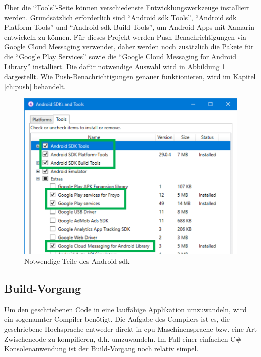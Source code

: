 Über die \enquote{Tools}-Seite können verschiedenste Entwicklungswerkzeuge installiert werden.
Grundsätzlich erforderlich sind \enquote{Android \ac{sdk} Tools}, \enquote{Android \ac{sdk} Platform Tools} und \enquote{Android \ac{sdk} Build Tools}, um Android-Apps mit Xamarin entwickeln zu können.
Für dieses Projekt werden Push-Benachrichtigungen via Google Cloud Messaging verwendet, daher werden noch zusätzlich die Pakete für die \enquote{Google Play Services} sowie die \enquote{Google Cloud Messaging for Android Library} installiert.
Die dafür notwendige Auswahl wird in Abbildung \ref{fig:android-sdk-tools} dargestellt.
Wie Push-Benachrichtigungen genauer funktionieren, wird im Kapitel \ref{ch:push} behandelt.
\begin{figure}[htbp!]
    \centering\includegraphics[width=0.8\linewidth]{images/auswahl_rahmenwerk/android_sdk_auswahl.png}    
    \caption{Notwendige Teile des Android \ac{sdk}}
    \label{fig:android-sdk-tools}
\end{figure}

\subsection{Build-Vorgang}
Um den geschriebenen Code in eine lauffähige Applikation umzuwandeln, wird ein sogenannter Compiler benötigt.
Die Aufgabe des Compilers ist es, die geschriebene Hochsprache entweder direkt in \ac{cpu}-Maschinensprache bzw. eine Art Zwischencode zu kompilieren, d.h. umzuwandeln.
Im Fall einer einfachen C\#-Konsolenanwendung ist der Build-Vorgang noch relativ simpel.\par


